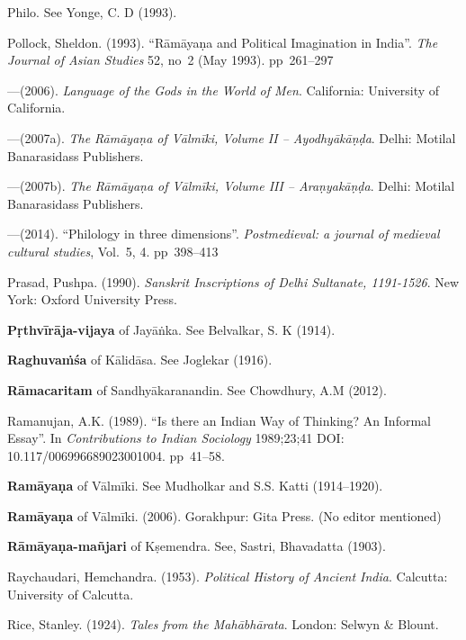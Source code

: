 \begin{thebibliography}{99}
Philo. See Yonge, C. D (1993).

Pollock, Sheldon. (1993). “Rāmāyaṇa and Political Imagination in India”. {\sl The Journal of Asian Studies} 52, no~2 (May 1993). pp~261--297

---\kern3pt(2006). {\sl Language of the Gods in the World of Men}. California: University of California. 

---\kern3pt(2007a). {\sl The Rāmāyaṇa of Vālmīki, Volume II – Ayodhyākāṇḍa}. Delhi: Motilal Banarasidass Publishers. 

---\kern3pt(2007b). {\sl The Rāmāyaṇa of Vālmīki, Volume III – Araṇyakāṇḍa}. Delhi: Motilal Banarasidass Publishers. 

---\kern3pt(2014). “Philology in three dimensions”. {\sl Postmedieval: a journal of medieval cultural studies}, Vol.~5, 4. pp~398--413

Prasad, Pushpa. (1990). {\sl Sanskrit Inscriptions of Delhi Sultanate, 1191-1526}. New York: Oxford University Press. 

{\bf Pṛthvīrāja-vijaya} of Jayāṅka. See Belvalkar, S. K (1914).

{\bf Raghuvaṁśa} of Kālidāsa. See Joglekar (1916).

{\bf Rāmacaritam} of Sandhyākaranandin. See Chowdhury, A.M (2012).

Ramanujan, A.K. (1989). “Is there an Indian Way of Thinking? An Informal Essay”. In {\sl Contributions to Indian Sociology} 1989;23;41 DOI: 10.117/006996689023001004. pp~41--58.

{\bf Ramāyaṇa} of Vālmīki. See Mudholkar and S.S. Katti (1914--1920).

{\bf Ramāyaṇa} of Vālmīki. (2006). Gorakhpur: Gita Press. (No editor mentioned)

{\bf Rāmāyaṇa-mañjari} of Kṣemendra. See, Sastri, Bhavadatta  (1903).

Raychaudari, Hemchandra. (1953). {\sl Political History of Ancient India}. Calcutta: University of Calcutta.

Rice, Stanley. (1924). {\sl Tales from the Mahābhārata}. London: Selwyn \& Blount. 


\end{thebibliography}

